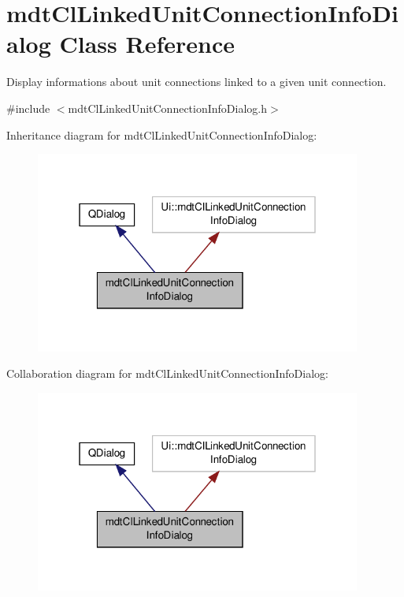 \hypertarget{classmdt_cl_linked_unit_connection_info_dialog}{\section{mdt\-Cl\-Linked\-Unit\-Connection\-Info\-Dialog Class Reference}
\label{classmdt_cl_linked_unit_connection_info_dialog}
}


Display informations about unit connections linked to a given unit connection.  




{\ttfamily \#include $<$mdt\-Cl\-Linked\-Unit\-Connection\-Info\-Dialog.\-h$>$}



Inheritance diagram for mdt\-Cl\-Linked\-Unit\-Connection\-Info\-Dialog\-:\nopagebreak
\begin{figure}[H]
\begin{center}
\leavevmode
\includegraphics[width=304pt]{classmdt_cl_linked_unit_connection_info_dialog__inherit__graph}
\end{center}
\end{figure}


Collaboration diagram for mdt\-Cl\-Linked\-Unit\-Connection\-Info\-Dialog\-:\nopagebreak
\begin{figure}[H]
\begin{center}
\leavevmode
\includegraphics[width=304pt]{classmdt_cl_linked_unit_connection_info_dialog__coll__graph}
\end{center}
\end{figure}
